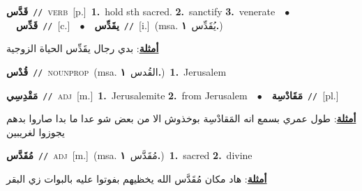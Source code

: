 \documentclass[10pt,a4paper,twoside]{article} %
\begin{document}
\begin{multicols}{2}
{\setlength\topsep{0pt}\textbf{\foreignlanguage{arabic}{قَدَّس}}\ {\color{gray}\texttt{//}\color{black}}\ \textsc{verb}\ [p.]\ \textbf{1.}~hold sth sacred.  \textbf{2.}~sanctify  \textbf{3.}~venerate\ \ $\bullet$\ \ \setlength\topsep{0pt}\textbf{\foreignlanguage{arabic}{قَدِّس}}\ {\color{gray}\texttt{//}\color{black}}\ [c.]\ \ $\bullet$\ \ \setlength\topsep{0pt}\textbf{\foreignlanguage{arabic}{يقَدِّس}}\ {\color{gray}\texttt{//}\color{black}}\ [i.]\ \color{gray}(msa. \foreignlanguage{arabic}{يُقَدِّس}~\foreignlanguage{arabic}{\textbf{١.}})\color{black}\  \begin{flushright}\color{gray}\foreignlanguage{arabic}{\textbf{\underline{\foreignlanguage{arabic}{أمثلة}}}: بدي رجال يقَدِّس الحياة الزوجية}\end{flushright}\color{black}} \vspace{2mm}

{\setlength\topsep{0pt}\textbf{\foreignlanguage{arabic}{قُدْس}}\ {\color{gray}\texttt{//}\color{black}}\ \textsc{noun\textunderscore prop}\ \color{gray}(msa. \foreignlanguage{arabic}{القُدس}~\foreignlanguage{arabic}{\textbf{١.}})\color{black}\ \textbf{1.}~Jerusalem\ } \vspace{2mm}

{\setlength\topsep{0pt}\textbf{\foreignlanguage{arabic}{مَقْدِسِي}}\ {\color{gray}\texttt{//}\color{black}}\ \textsc{adj}\ [m.]\ \textbf{1.}~Jerusalemite  \textbf{2.}~from Jerusalem\ \ $\bullet$\ \ \setlength\topsep{0pt}\textbf{\foreignlanguage{arabic}{مَقَادْسِة}}\ {\color{gray}\texttt{//}\color{black}}\ [pl.]\  \begin{flushright}\color{gray}\foreignlanguage{arabic}{\textbf{\underline{\foreignlanguage{arabic}{أمثلة}}}: طول عمري بسمع انه المَقادْسِة بوخذوش الا من بعض شو عدا ما بدا صاروا بدهم يجوزوا لغريبين}\end{flushright}\color{black}} \vspace{2mm}

{\setlength\topsep{0pt}\textbf{\foreignlanguage{arabic}{مُقَدَّس}}\ {\color{gray}\texttt{//}\color{black}}\ \textsc{adj}\ [m.]\ \color{gray}(msa. \foreignlanguage{arabic}{مُقَدَّس}~\foreignlanguage{arabic}{\textbf{١.}})\color{black}\ \textbf{1.}~sacred  \textbf{2.}~divine\  \begin{flushright}\color{gray}\foreignlanguage{arabic}{\textbf{\underline{\foreignlanguage{arabic}{أمثلة}}}: هاد مكان مُقَدَّس الله يخظيهم بفوتوا عليه بالبوات زي البقر}\end{flushright}\color{black}} \vspace{2mm}


\end{multicols}
\end{document}
